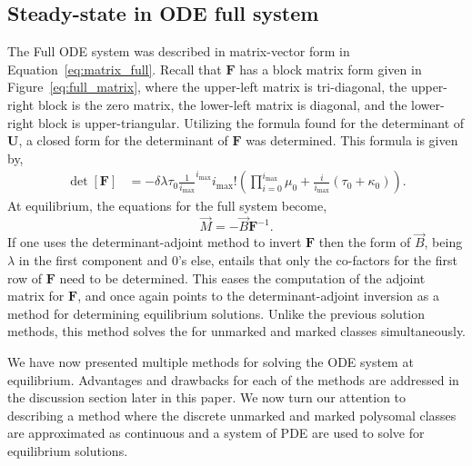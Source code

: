 \documentclass[review]{elsarticle}
\newcommand{\imax}{\ensuremath{i_{\max}}\xspace}
\let\bs\boldsymbol
\begin{document}
\subsection{Steady-state in ODE full system}
The Full ODE system was described in matrix-vector form in Equation~\ref{eq:matrix_full}.
Recall that $\bs{F}$ has a block matrix form given in Figure~\ref{eq:full_matrix}, where the upper-left matrix is tri-diagonal, the upper-right block is the zero matrix, the lower-left matrix is diagonal, and the lower-right block is upper-triangular.
Utilizing the formula found for the determinant of $\bs{U}$, a closed form for the determinant of $\bs{F}$ was determined.
This formula is given by,
\begin{align}
  \label{eq:full_matrix_det}
  \det[\bs{F}] %
            &=-\delta \lambda \tau_0\frac{1}{\imax}^{\imax}\imax!\left(\prod_{i=0}^{\imax}\mu_0 +\frac{i}{\imax} \left(\tau_0 + \kappa_0\right)\right).
\end{align}
At equilibrium, the equations for the full system become,
\begin{equation}
\vec{M}=-\vec{B}\bs{F}^{-1}.
\end{equation}
If one uses the determinant-adjoint method to invert $\bs{F}$ then the form of $\vec{B}$, being $\lambda$ in the first component and 0's else, entails that only the co-factors for the first row of $\bs{F}$ need to be determined.
This eases the computation of the adjoint matrix for $\bs{F}$, and once again points to the determinant-adjoint inversion as a method for determining equilibrium solutions.
Unlike the previous solution methods, this method solves the for unmarked and marked classes simultaneously.

We have now presented multiple methods for solving the ODE system at equilibrium.
Advantages and drawbacks for each of the methods are addressed in the discussion section later in this paper.
We now turn our attention to describing a method where the discrete unmarked and marked polysomal classes are approximated as continuous and a system of PDE are used to solve for equilibrium solutions.
\end{document}
